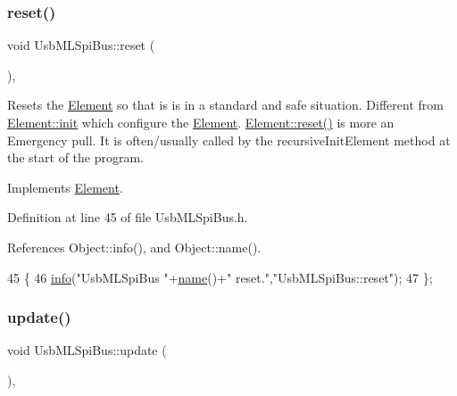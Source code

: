 \subsubsection{\texorpdfstring{reset()}{reset()}}
{\footnotesize\ttfamily void Usb\+M\+L\+Spi\+Bus\+::reset (\begin{DoxyParamCaption}{ }\end{DoxyParamCaption})\hspace{0.3cm}{\ttfamily [inline]}, {\ttfamily [virtual]}}

Resets the \hyperlink{classElement}{Element} so that is is in a standard and safe situation. Different from \hyperlink{classElement_af42754b5cabc198869222725218d695c}{Element\+::init} which configure the \hyperlink{classElement}{Element}. \hyperlink{classElement_a69efffa22f06909d768149715565cb56}{Element\+::reset()} is more an Emergency pull. It is often/usually called by the recursive\+Init\+Element method at the start of the program. 

Implements \hyperlink{classElement_a69efffa22f06909d768149715565cb56}{Element}.



Definition at line 45 of file Usb\+M\+L\+Spi\+Bus.\+h.



References Object\+::info(), and Object\+::name().


\begin{DoxyCode}
45                \{
46     \hyperlink{classObject_a644fd329ea4cb85f54fa6846484b84a8}{info}(\textcolor{stringliteral}{"UsbMLSpiBus "}+\hyperlink{classObject_a300f4c05dd468c7bb8b3c968868443c1}{name}()+\textcolor{stringliteral}{" reset."},\textcolor{stringliteral}{"UsbMLSpiBus::reset"});
47   \};
\end{DoxyCode}
\mbox{\label{classUsbMLSpiBus_ac060fc74b974a48e97e992f2a6c9773c}} 
\subsubsection{\texorpdfstring{update()}{update()}}
{\footnotesize\ttfamily void Usb\+M\+L\+Spi\+Bus\+::update (\begin{DoxyParamCaption}{ }\end{DoxyParamCaption})\hspace{0.3cm}{\ttfamily [inline]}, {\ttfamily [virtual]}}

